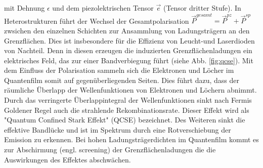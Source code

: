 %
mit Dehnung $\epsilon$ und dem piezolektrischen Tensor $\vec{e}$ (Tensor dritter Stufe).
\newline
In Heterostrukturen führt der Wechsel der Gesamtpolarisation $\vec{P}^{gesamt} = \vec{P}^{pz} + \vec{P}^{sp}$ zwsichen den einzelnen Schichten zur Ansammlung von Ladungsträgern an den Grenzflächen. Dies ist insbesondere für die Effizienz von Leucht-und Laserdioden von Nachteil. Denn in diesen erzeugen die induzierten Grenzflächenladungen ein elektrisches Feld, das zur einer Bandverbiegung führt (siehe Abb. \ref{fig:qcse}). Mit dem Einfluss der Polarisation sammeln sich die Elektronen und Löcher im Quantenfilm somit auf gegenüberliegenden Seiten. Dies führt dazu, dass der räumliche Überlapp der Wellenfunktionen von Elektronen und Löchern abnimmt. Durch das verringerte Überlappintegral der Wellenfunktionen sinkt nach Fermis Goldener Regel auch die strahlende Rekombinationsrate. Dieser Effekt wird als "Quantum Confined Stark Effekt"  (QCSE) bezeichnet. Des Weiteren sinkt die effektive Bandlücke und ist im Spektrum durch eine Rotverschiebung der Emission zu erkennen. Bei hohen Ladungsträgerdichten im Quantenfilm kommt es zur Abschirmung (engl. screening) der Grenzflächenladungen die die Auswirkungen des Effektes abschwächen.
